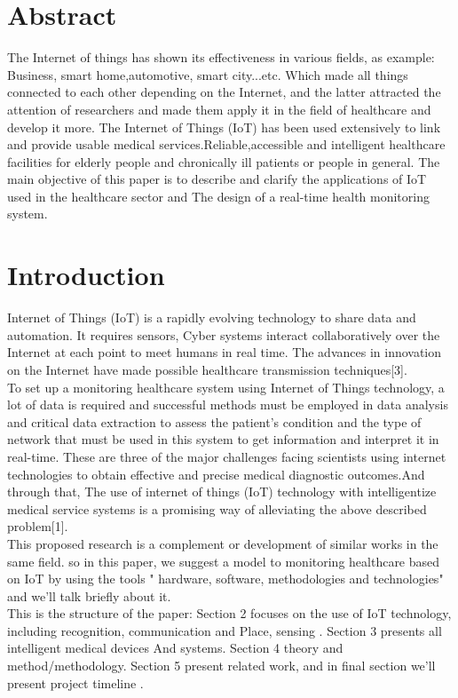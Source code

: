 \documentclass[paper=a4, fontsize=11pt]{scrartcl}
\numberwithin{equation}{section}		%
\numberwithin{figure}{section}			%
\numberwithin{table}{section}				%
\begin{document}
\section{Abstract}
The Internet of things has shown its effectiveness in various fields, as example: Business, smart home,automotive, smart city...etc. 
Which made all things connected to each other depending on the Internet, and the latter attracted the attention of researchers and made them apply it in the field of healthcare and develop it more. 
The Internet of Things (IoT) has been used extensively to link and provide usable medical services.Reliable,accessible and intelligent healthcare facilities for elderly people and chronically ill patients or people in general. 
The main objective of this paper is to describe and clarify the applications of IoT used in the healthcare sector and The design of a real-time health monitoring system.


\section{Introduction}
Internet of Things (IoT) is a rapidly evolving technology to share data and automation. It requires sensors, Cyber systems interact collaboratively over the Internet at each point to meet humans in real time. The advances in innovation on the Internet have made possible healthcare transmission techniques[3]. \\
To set up a monitoring healthcare system using Internet of Things technology, a lot of data is required and successful methods must be employed in data analysis and critical data extraction to assess the patient's condition and the type of network that must be used in this system to get information and interpret it in real-time. These are three of the major challenges facing scientists using internet technologies to obtain effective and precise medical diagnostic outcomes.And through that, The use of internet of things (IoT) technology with intelligentize medical service systems is a promising way of alleviating the above described problem[1].\\
This proposed research is a complement or development of similar works in the same field. so in this paper, we suggest a model to monitoring healthcare based on IoT by using the tools " hardware, software, methodologies and technologies" and we'll talk briefly about it.\\
This is the structure of the paper: Section 2 focuses on the use of IoT technology, including recognition, communication and Place, sensing . Section 3 presents all intelligent medical devices
And systems. Section 4 theory and method/methodology. Section 5 present related work, and in final section we'll present project timeline .
\end{document}
